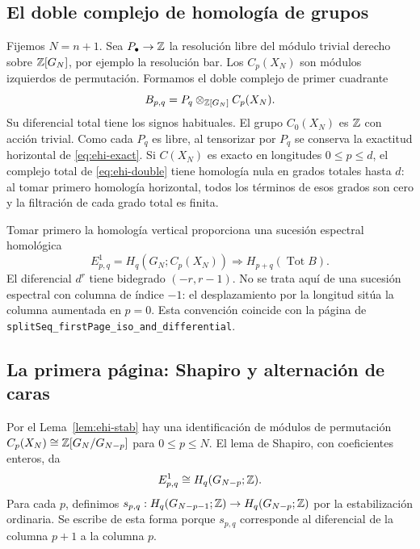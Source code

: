 \subsection{El doble complejo de homología de grupos}

Fijemos $N=n+1$. Sea $P_\bullet\to\mathbb{Z}$ la resolución libre del módulo trivial derecho sobre $\mathbb{Z}[G_N]$, por ejemplo la resolución bar. Los $C_p(X_N)$ son módulos izquierdos de permutación. Formamos el doble complejo de primer cuadrante
\begin{equation}
 B_{p,q}=P_q\otimes_{\mathbb{Z}[G_N]} C_p(X_N).
 \label{eq:ehi-double}
\end{equation}
Su diferencial total tiene los signos habituales. El grupo $C_0(X_N)$ es $\mathbb{Z}$ con acción trivial. Como cada $P_q$ es libre, al tensorizar por $P_q$ se conserva la exactitud horizontal de \eqref{eq:ehi-exact}. Si $C(X_N)$ es exacto en longitudes $0\le p\le d$, el complejo total de \eqref{eq:ehi-double} tiene homología nula en grados totales hasta $d$: al tomar primero homología horizontal, todos los términos de esos grados son cero y la filtración de cada grado total es finita.

Tomar primero la homología vertical proporciona una sucesión espectral homológica
\begin{equation}
 E^1_{p,q}=H_q(G_N;C_p(X_N))\Longrightarrow H_{p+q}(\operatorname{Tot}B).
 \label{eq:ehi-ss}
\end{equation}
El diferencial $d^r$ tiene bidegrado $(-r,r-1)$. No se trata aquí de una sucesión espectral con columna de índice $-1$: el desplazamiento por la longitud sitúa la columna aumentada en $p=0$. Esta convención coincide con la página de \texttt{splitSeq\_firstPage\_iso\_and\_differential}.

\subsection{La primera página: Shapiro y alternación de caras}

Por el Lema~\ref{lem:ehi-stab} hay una identificación de módulos de permutación $C_p(X_N)\cong\mathbb{Z}[G_N/G_{N-p}]$ para $0\le p\le N$. El lema de Shapiro, con coeficientes enteros, da
\begin{equation}
 E^1_{p,q}\cong H_q(G_{N-p};\mathbb{Z}).
 \label{eq:ehi-shapiro}
\end{equation}
Para cada $p$, definimos $s_{p,q}:H_q(G_{N-p-1};\mathbb{Z})\to H_q(G_{N-p};\mathbb{Z})$ por la estabilización ordinaria. Se escribe de esta forma porque $s_{p,q}$ corresponde al diferencial de la columna $p+1$ a la columna $p$.

